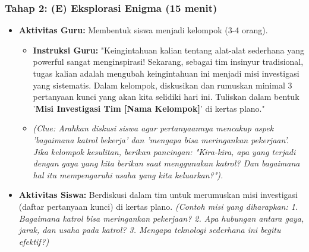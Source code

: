 \documentclass[a4paper,12pt]{article}
\begin{document}
\subsubsection{Tahap 2: (E) Eksplorasi Enigma (15 menit)}
\begin{itemize}
\item \textbf{Aktivitas Guru:} Membentuk siswa menjadi kelompok (3-4 orang).
    \begin{itemize}
    \item \textbf{Instruksi Guru:} "Keingintahuan kalian tentang alat-alat sederhana yang powerful sangat menginspirasi! Sekarang, sebagai tim insinyur tradisional, tugas kalian adalah mengubah keingintahuan ini menjadi misi investigasi yang sistematis. Dalam kelompok, diskusikan dan rumuskan minimal 3 pertanyaan kunci yang akan kita selidiki hari ini. Tuliskan dalam bentuk '\textbf{Misi Investigasi Tim [Nama Kelompok]}' di kertas plano."
    \item \textit{(Clue: Arahkan diskusi siswa agar pertanyaannya mencakup aspek 'bagaimana katrol bekerja' dan 'mengapa bisa meringankan pekerjaan'. Jika kelompok kesulitan, berikan pancingan: "Kira-kira, apa yang terjadi dengan gaya yang kita berikan saat menggunakan katrol? Dan bagaimana hal itu mempengaruhi usaha yang kita keluarkan?").}
    \end{itemize}
\item \textbf{Aktivitas Siswa:} Berdiskusi dalam tim untuk merumuskan misi investigasi (daftar pertanyaan kunci) di kertas plano. \textit{(Contoh misi yang diharapkan: 1. Bagaimana katrol bisa meringankan pekerjaan? 2. Apa hubungan antara gaya, jarak, dan usaha pada katrol? 3. Mengapa teknologi sederhana ini begitu efektif?)}
\end{itemize}
\end{document}
